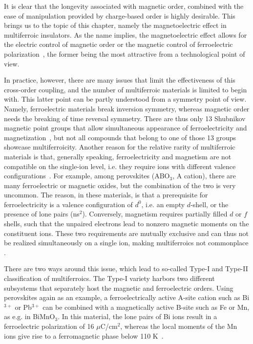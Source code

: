 It is clear that the longevity associated with magnetic order, combined with the ease of manipulation provided by charge-based order is highly desirable.
This brings us to the topic of this chapter, namely the magnetoelectric effect in multiferroic insulators.
As the name implies, the magnetoelectric effect allows for the electric control of magnetic order or the magnetic control of ferroelectric polarization~\cite{Spaldin2019,Khomskii2009,Fiebig2005,Fiebig2016,Cheong2007}, the former being the most attractive from a technological point of view.

In practice, however, there are many issues that limit the effectiveness of this cross-order coupling, and the number of multiferroic materials is limited to begin with.
This latter point can be partly understood from a symmetry point of view.
Namely, ferroelectric materials break inversion symmetry, whereas magnetic order needs the breaking of time reversal symmetry.
There are thus only 13 Shubnikov magnetic point groups that allow simultaneous appearance of ferroelectricity and magnetization~\cite{Wang2009}, but not all compounds that belong to one of those 13 groups showcase multiferroicity.
Another reason for the relative rarity of multiferroic materials is that, generally speaking, ferroelectricity and magnetism are not compatible on the single-ion level, i.e. they require ions with different valence configurations~\cite{Spaldin2019}.
For example, among perovskites (ABO$_3$, A cation), there are many ferroelectric or magnetic oxides, but the combination of the two is very uncommon.
The reason, in these materials, is that a prerequisite for ferroelectricity is a valence configuration of $d^0$, i.e. an empty $d$-shell, or the presence of lone pairs (ns$^2$).
Conversely, magnetism requires partially filled $d$ or $f$ shells, such that the unpaired electrons lead to nonzero magnetic moments on the constituent ions.
These two requirements are mutually exclusive and can thus not be realized simultaneously on a single ion, making multiferroics not commonplace .

There are two ways around this issue, which lead to so-called Type-I and Type-II classification of multiferroics\cite{Khomskii2009}.
The Type-I variety harbors two different subsystems that separately host the magnetic and ferroelectric orders.
Using perovskites again as an example, a ferroelectrically active A-site cation such as Bi$^{3+}$ or Pb$^{3+}$ can be combined with a magnetically active B-site such as Fe or Mn, as e.g. in BiMnO$_3$.
In this material, the lone pairs of Bi ions result in a ferroelectric polarization of 16 $\mu$C/cm$^2$, whereas the local moments of the Mn ions give rise to a ferromagnetic phase below 110 K~\cite{Wang2009}.

